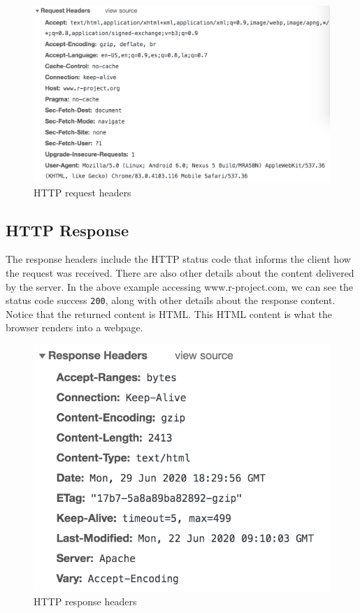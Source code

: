 \documentclass[
]{book}
\begin{document}
\begin{figure}

{\centering \includegraphics[width=0.9\linewidth]{images/http/web-http-request-headers} 

}

\caption{HTTP request headers}\label{fig:unnamed-chunk-13}
\end{figure}

\hypertarget{http-response}{%
\subsection{HTTP Response}\label{http-response}}

The response headers include the HTTP status code that informs the client how
the request was received. There are also other details about the
content delivered by the server. In the above example accessing
www.r-project.com, we can see the status code success \texttt{200}, along with other
details about the response content. Notice that the returned content is HTML.
This HTML content is what the browser renders into a webpage.

\begin{figure}

{\centering \includegraphics[width=0.5\linewidth]{images/http/web-http-response-headers} 

}

\caption{HTTP response headers}\label{fig:unnamed-chunk-14}
\end{figure}
\end{document}
